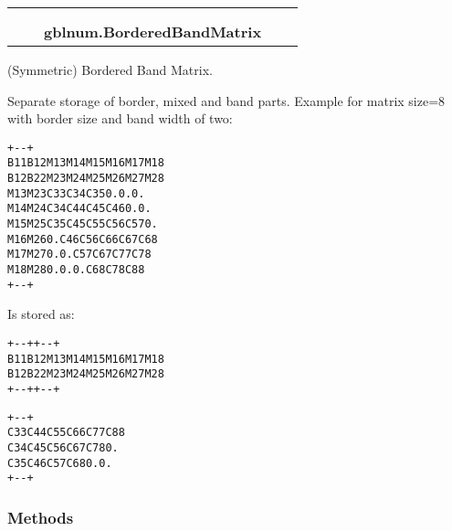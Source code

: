     \label{gblnum:BorderedBandMatrix}
\begin{tabular}{cccccc}
\multicolumn{2}{r}{\settowidth{\BCL}{object}\multirow{2}{\BCL}{object}}
&&
  \\\cline{3-3}
  &&\multicolumn{1}{c|}{}
&&
  \\
&&\multicolumn{2}{l}{\textbf{gblnum.BorderedBandMatrix}}
\end{tabular}

(Symmetric) Bordered Band Matrix.

Separate storage of border, mixed and band parts. Example for matrix size=8
with border size and band width of two:

\begin{alltt}
  +-                                 -+
  {\textbar}  B11 B12 M13 M14 M15 M16 M17 M18  {\textbar}
  {\textbar}  B12 B22 M23 M24 M25 M26 M27 M28  {\textbar}
  {\textbar}  M13 M23 C33 C34 C35  0.  0.  0.  {\textbar}
  {\textbar}  M14 M24 C34 C44 C45 C46  0.  0.  {\textbar}
  {\textbar}  M15 M25 C35 C45 C55 C56 C57  0.  {\textbar}
  {\textbar}  M16 M26  0. C46 C56 C66 C67 C68  {\textbar}
  {\textbar}  M17 M27  0.  0. C57 C67 C77 C78  {\textbar}
  {\textbar}  M18 M28  0.  0.  0. C68 C78 C88  {\textbar}
  +-                                 -+\end{alltt}

Is stored as:

\begin{alltt}
  +-         -+     +-                         -+
  {\textbar}  B11 B12  {\textbar}     {\textbar}  M13 M14 M15 M16 M17 M18  {\textbar} 
  {\textbar}  B12 B22  {\textbar}     {\textbar}  M23 M24 M25 M26 M27 M28  {\textbar}
  +-         -+     +-                         -+
  
                    +-                         -+
                    {\textbar}  C33 C44 C55 C66 C77 C88  {\textbar}
                    {\textbar}  C34 C45 C56 C67 C78  0.  {\textbar}
                    {\textbar}  C35 C46 C57 C68  0.  0.  {\textbar}
                    +-                         -+\end{alltt}



  \subsubsection{Methods}

